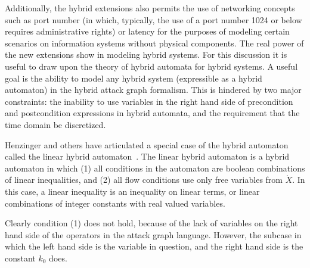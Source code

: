 Additionally, the hybrid extensions also permits the use of
networking concepts such as port number (in which, typically, the use of a
port number 1024 or below requires administrative rights) or latency for the
purposes of modeling certain scenarios on information systems without physical
components.
The real power of the new extensions show in modeling hybrid systems. For
this discussion it is useful to draw upon the theory of hybrid automata for
hybrid systems. A useful goal is the ability to model any hybrid system
(expressible as a hybrid automaton) in the hybrid attack graph formalism. This
is hindered by two major constraints: the inability to use variables
in the right hand side of precondition and postcondition expressions in
hybrid automata, and the requirement that the time domain be discretized.

\label{sec:hag_ha}
Henzinger and others have articulated a special case of the
hybrid automaton called the linear hybrid automaton~\cite{henzinger1996theory}.
The linear hybrid automaton is a hybrid automaton in which (1) all conditions
in the automaton are boolean combinations of linear inequalities, and (2) all
flow conditions use only free variables from $\dot{X}$. In this case, a linear
inequality is an inequality on linear terms, or linear combinations of
integer constants with real valued variables.

Clearly condition (1) does not hold, because of the lack of variables
on the right hand side of the operators in the attack graph language. However,
the subcase in which the left hand side is the variable in question, and the
right hand side is the constant $k_0$ does.

